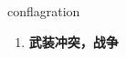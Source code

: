 
\begin{frame}
{\huge conflagration}
\begin{center}
\begin{enumerate}\Large
  \item \textbf{武装冲突，战争}
\end{enumerate}
\end{center}
\end{frame}
